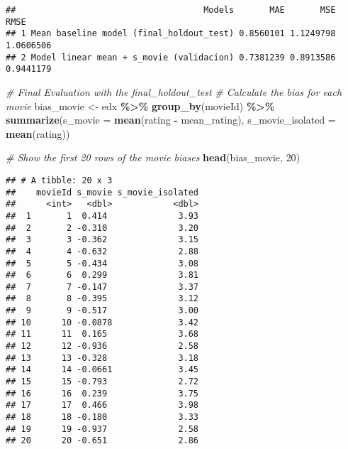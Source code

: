 \documentclass[
]{article}
\newenvironment{Shaded}{\begin{snugshade}}{\end{snugshade}}
\newcommand{\AttributeTok}[1]{\textcolor[rgb]{0.13,0.29,0.53}{#1}}
\newcommand{\CommentTok}[1]{\textcolor[rgb]{0.56,0.35,0.01}{\textit{#1}}}
\newcommand{\DecValTok}[1]{\textcolor[rgb]{0.00,0.00,0.81}{#1}}
\newcommand{\FunctionTok}[1]{\textcolor[rgb]{0.13,0.29,0.53}{\textbf{#1}}}
\newcommand{\NormalTok}[1]{#1}
\newcommand{\OtherTok}[1]{\textcolor[rgb]{0.56,0.35,0.01}{#1}}
\newcommand{\SpecialCharTok}[1]{\textcolor[rgb]{0.81,0.36,0.00}{\textbf{#1}}}
\begin{document}
\begin{verbatim}
##                                     Models       MAE       MSE      RMSE
## 1 Mean baseline model (final_holdout_test) 0.8560101 1.1249798 1.0606506
## 2 Model linear mean + s_movie (validacion) 0.7381239 0.8913586 0.9441179
\end{verbatim}

\begin{Shaded}
\begin{Highlighting}[]
\CommentTok{\# Final Evaluation with the final\_holdout\_test}
\CommentTok{\# Calculate the bias for each movie}
\NormalTok{bias\_movie }\OtherTok{\textless{}{-}}\NormalTok{ edx }\SpecialCharTok{\%\textgreater{}\%}
  \FunctionTok{group\_by}\NormalTok{(movieId) }\SpecialCharTok{\%\textgreater{}\%}
  \FunctionTok{summarize}\NormalTok{(}\AttributeTok{s\_movie =} \FunctionTok{mean}\NormalTok{(rating }\SpecialCharTok{{-}}\NormalTok{ mean\_rating),}
            \AttributeTok{s\_movie\_isolated =} \FunctionTok{mean}\NormalTok{(rating))}

\CommentTok{\# Show the first 20 rows of the movie biases}
\FunctionTok{head}\NormalTok{(bias\_movie, }\DecValTok{20}\NormalTok{)}
\end{Highlighting}
\end{Shaded}

\begin{verbatim}
## # A tibble: 20 x 3
##    movieId s_movie s_movie_isolated
##      <int>   <dbl>            <dbl>
##  1       1  0.414              3.93
##  2       2 -0.310              3.20
##  3       3 -0.362              3.15
##  4       4 -0.632              2.88
##  5       5 -0.434              3.08
##  6       6  0.299              3.81
##  7       7 -0.147              3.37
##  8       8 -0.395              3.12
##  9       9 -0.517              3.00
## 10      10 -0.0878             3.42
## 11      11  0.165              3.68
## 12      12 -0.936              2.58
## 13      13 -0.328              3.18
## 14      14 -0.0661             3.45
## 15      15 -0.793              2.72
## 16      16  0.239              3.75
## 17      17  0.466              3.98
## 18      18 -0.180              3.33
## 19      19 -0.937              2.58
## 20      20 -0.651              2.86
\end{verbatim}
\end{document}
